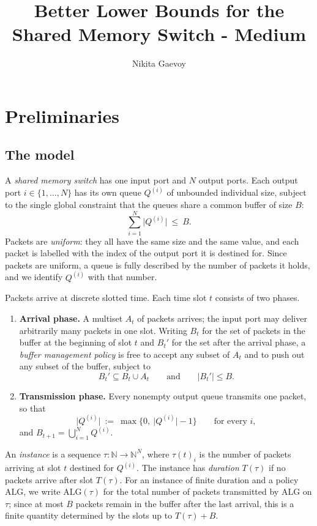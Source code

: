 \documentclass[10pt]{article}
\title{Better Lower Bounds for the Shared Memory Switch - Medium}
\author{Nikita Gaevoy}
\date{}
\newcommand{\ALG}{\text{ALG}}
\begin{document}
\maketitle

\section{Preliminaries}

\subsection{The model}

A \emph{shared memory switch} has one input port and $N$ output ports. Each
output port $i\in\{1,\ldots,N\}$ has its own queue $Q^{(i)}$ of unbounded
individual size, subject to the single global constraint that the queues share
a common buffer of size $B$:
\[
\sum_{i=1}^{N}\bigl|Q^{(i)}\bigr|\ \le\ B .
\]
Packets are \emph{uniform}: they all have the same size and the same value, and
each packet is labelled with the index of the output port it is destined for.
Since packets are uniform, a queue is fully described by the number of packets
it holds, and we identify $Q^{(i)}$ with that number.

Packets arrive at discrete slotted time. Each time slot $t$ consists of two
phases.
\begin{enumerate}
    \item \textbf{Arrival phase.} A multiset $A_t$ of packets arrives; the
    input port may deliver arbitrarily many packets in one slot. Writing $B_t$
    for the set of packets in the buffer at the beginning of slot $t$ and
    $B_t'$ for the set after the arrival phase, a \emph{buffer management
    policy} is free to accept any subset of $A_t$ and to push out any subset of
    the buffer, subject to
    \[
    B_t'\subseteq B_t\cup A_t
    \qquad\text{and}\qquad
    |B_t'|\le B .
    \]
    \item \textbf{Transmission phase.} Every nonempty output queue transmits
    one packet, so that
    \[
    \bigl|Q^{(i)}\bigr|
    \ :=\
    \max\bigl\{0,\ \bigl|Q^{(i)}\bigr|-1\bigr\}
    \qquad\text{for every } i,
    \]
    and $B_{t+1}=\bigcup_{i=1}^{N}Q^{(i)}$.
\end{enumerate}

An \emph{instance} is a sequence $\tau:\mathbb{N}\to\mathbb{N}^{N}$, where
$\tau(t)_i$ is the number of packets arriving at slot $t$ destined for
$Q^{(i)}$. The instance has \emph{duration} $T(\tau)$ if no packets arrive
after slot $T(\tau)$. For an instance of finite duration and a policy $\ALG$,
we write $\ALG(\tau)$ for the total number of packets transmitted by $\ALG$ on
$\tau$; since at most $B$ packets remain in the buffer after the last arrival,
this is a finite quantity determined by the slots up to $T(\tau)+B$.
\end{document}
